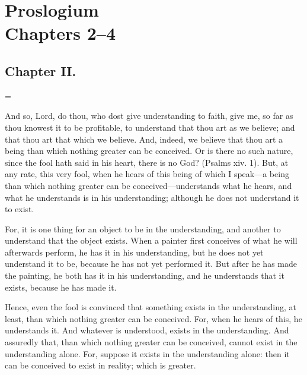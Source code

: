 
\author{Anselm of Canterbury}
\chapter[Anselm of Canterbury -- Proslogium, chaps.
2--4]{Proslogium\\\smaller Chapters 2--4}


\section*{Chapter II.}

\hangindent=\parindent
{}

\vspace{1\baselineskip}

And so, Lord, do thou, who dost give understanding to faith, give me,
so far as thou knowest it to be profitable, to understand that thou
art as we believe; and that thou art that which we believe. And,
indeed, we believe that thou art a being than which nothing greater
can be conceived. Or is there no such nature, since the fool hath said
in his heart, there is no God? (Psalms xiv. 1). But, at any rate,
this very fool, when he hears of this being of which I speak---a being
than which nothing greater can be con\-ceived---understands what he
hears, and what he understands is in his understanding; although he
does not understand it to exist.

For, it is one thing for an object to be in the understanding, and
another to understand that the object exists. When a painter first
conceives of what he will afterwards perform, he has it in his
understanding, but he does not yet understand it to be, because he has
not yet performed it. But after he has made the painting, he both has
it in his understanding, and he understands that it exists, because he
has made it.

Hence, even the fool is convinced that something exists in the
understanding, at least, than which nothing greater can be conceived.
For, when he hears of this, he understands it. And whatever is
understood, exists in the understanding. And assuredly that, than
which nothing greater can be conceived, cannot exist in the
understanding alone. For, suppose it exists in the understanding
alone: then it can be conceived to exist in reality; which is greater.

